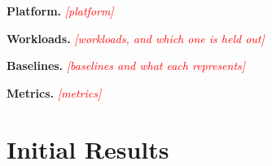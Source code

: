 \documentclass[conference,10pt,letterpaper]{IEEEtran}
\newcommand{\pw}[1]{\textcolor{red}{\textit{[#1]}}}
\begin{document}
\textbf{Platform.} \pw{platform}

\textbf{Workloads.} \pw{workloads, and which one is held out}

\textbf{Baselines.} \pw{baselines and what each represents}

\textbf{Metrics.} \pw{metrics}

\section{Initial Results}
\end{document}
